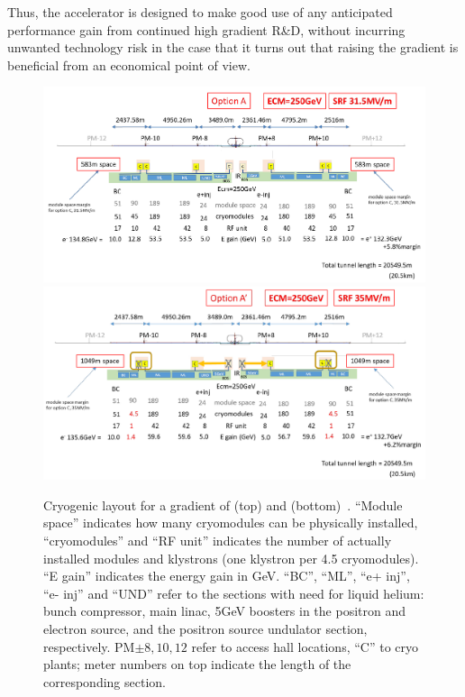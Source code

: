 Thus, the accelerator is designed to make good use of any anticipated performance gain from continued high gradient R\&D, without incurring unwanted technology risk in the case that it turns out that raising the gradient is beneficial from an economical point of view.

\begin{figure}[htbp]
   \includegraphics[width=\hsize]{chapters/figures/arxiv-1711-00568-fig-3-4}
   \includegraphics[width=\hsize]{chapters/figures/arxiv-1711-00568-fig-3-7}
\caption{Cryogenic layout for a gradient of  (top) and  (bottom)~\cite{Evans:2017rvt}.
``Module space'' indicates how many cryomodules can be physically installed, ``cryomodules'' and ``RF unit'' indicates the number of actually installed modules and klystrons (one klystron per 4.5 cryomodules). ``E gain'' indicates the energy gain in GeV. ``BC'', ``ML'', ``e+ inj'', ``e- inj'' and ``UND'' refer to the sections with need for liquid helium: bunch compressor, main linac, 5GeV boosters in the positron and electron source, and the positron source undulator section, respectively. PM$\pm8, 10, 12$ refer to access hall locations, ``C'' to cryo plants; meter numbers on top indicate the length of the corresponding section.}
\label{fig:ml-cryo-opta}
\end{figure}



